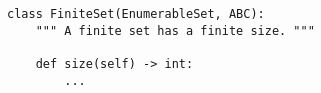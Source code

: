 \begin{verbatim}
class FiniteSet(EnumerableSet, ABC):
    """ A finite set has a finite size. """

    def size(self) -> int:
        ...
\end{verbatim}